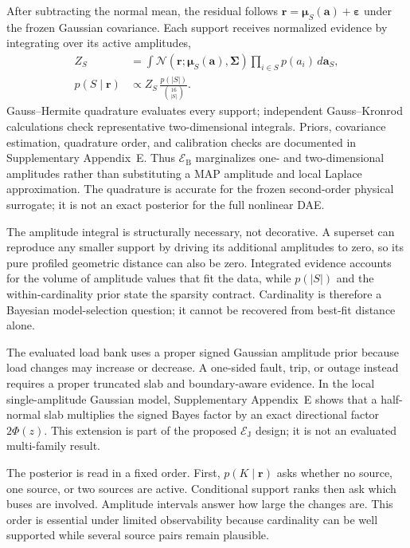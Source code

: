 After subtracting the normal mean, the residual follows
$\bm r=\bm\mu_S(\bm a)+\bm\varepsilon$ under the frozen Gaussian covariance. Each support receives normalized evidence by integrating over its active amplitudes,
\begin{align}
 Z_S&=\int \mathcal N(\bm r;\bm\mu_S(\bm a),\bm\Sigma)
 \prod_{i\in S}p(a_i)\,d\bm a_S,\nonumber\\
 p(S\mid\bm r)&\propto Z_S\,\frac{p(|S|)}{\binom{16}{|S|}}.
 \label{eq:load-support-posterior}
\end{align}
Gauss--Hermite quadrature evaluates every support; independent Gauss--Kronrod calculations check representative two-dimensional integrals. Priors, covariance estimation, quadrature order, and calibration checks are documented in Supplementary Appendix~E.
Thus $\mathcal E_{\mathrm B}$ marginalizes one- and two-dimensional amplitudes
rather than substituting a MAP amplitude and local Laplace approximation. The
quadrature is accurate for the frozen second-order physical surrogate; it is not
an exact posterior for the full nonlinear DAE.

The amplitude integral is structurally necessary, not decorative. A superset can
reproduce any smaller support by driving its additional amplitudes to zero, so its
pure profiled geometric distance can also be zero. Integrated evidence accounts
for the volume of amplitude values that fit the data, while $p(|S|)$ and the
within-cardinality prior state the sparsity contract. Cardinality is therefore a
Bayesian model-selection question; it cannot be recovered from best-fit distance
alone.

The evaluated load bank uses a proper signed Gaussian amplitude prior because
load changes may increase or decrease. A one-sided fault, trip, or outage instead
requires a proper truncated slab and boundary-aware evidence. In the local
single-amplitude Gaussian model, Supplementary Appendix~E shows that a
half-normal slab multiplies the signed Bayes factor by an exact directional
factor $2\Phi(z)$. This extension is part of the proposed $\mathcal E_{\mathrm J}$ design; it is
not an evaluated multi-family result.

The posterior is read in a fixed order. First, $p(K\mid\bm r)$ asks whether no source, one source, or two sources are active. Conditional support ranks then ask which buses are involved. Amplitude intervals answer how large the changes are. This order is essential under limited observability because cardinality can be well supported while several source pairs remain plausible.

